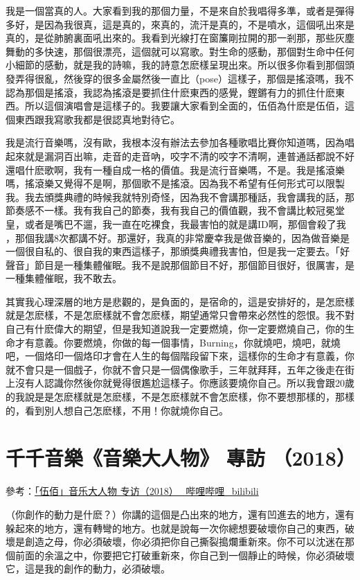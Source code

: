 \documentclass[UTF8,a4paper,oneside,twocolumn,12pt]{ctexbook}
\begin{document}
我是一個當真的人。大家看到我的那個力量，不是來自於我唱得多準，或者是彈得多好，是因為我很真，這是真的，來真的，流汗是真的，不是噴水，這個吼出來是真的，是從肺腑裏面吼出來的。我看到光線打在窗簾剛拉開的那一剎那，那些灰塵舞動的多快速，那個很漂亮，這個就可以寫歌。對生命的感動，那個對生命中任何小細節的感動，就是我的詩嘛，我的詩意怎麽樣呈現出來。所以很多你看到那個頭發弄得很亂，然後穿的很多金屬然後一直比（pose）這樣子，那個是搖滾嗎，我不認為那個是搖滾，我認為搖滾是要抓住什麽東西的感覺，鏗鏘有力的抓住什麽東西。所以這個演唱會是這樣子的。我要讓大家看到全面的，伍佰為什麽是伍佰，這個東西跟我寫歌我都是很認真地對待它。

我是流行音樂嗎，沒有歐，我根本沒有辦法去參加各種歌唱比賽你知道嗎，因為唱起來就是漏洞百出嘛，走音的走音吶，咬字不清的咬字不清啊，連普通話都說不好還唱什麽歌啊，我有一種自成一格的價值。我是流行音樂嗎，不是。我是搖滾樂嗎，搖滾樂又覺得不是啊，那個歌不是搖滾。因為我不希望有任何形式可以限製我。我去頒獎典禮的時候我就特別奇怪，因為我不會講那種話，我會講我的話，那節奏感不一樣。我有我自己的節奏，我有我自己的價值觀，我不會講比較冠冕堂皇，或者是嘴巴不遛，我一直在吃裸食，我最害怕的就是講ID啊，那個會殺了我 ，那個我講8次都講不好。那還好，我真的非常慶幸我是做音樂的，因為做音樂是一個很自私的、很自我的東西這樣子，那頒獎典禮我害怕，但是我一定要去。「好聲音」節目是一種集體催眠。我不是說那個節目不好，那個節目很好，很厲害，是一種集體催眠，我不敢去。

其實我心理深層的地方是悲觀的，是負面的，是宿命的，這是安排好的，是怎麽樣就是怎麽樣，不是怎麽樣就不會怎麽樣，期望通常只會帶來必然性的怨恨。我不對自己有什麽偉大的期望，但是我知道說我一定要燃燒，你一定要燃燒自己，你的生命才有意義。你要燃燒，你做的每一個事情，Burning，你就燒吧，燒吧，就燒吧，一個烙印一個烙印才會在人生的每個階段留下來，這樣你的生命才有意義，你就不會只是一個戲子，你就不會只是一個偶像歌手，三年就拜拜，五年之後走在街上沒有人認識你然後你就覺得很尷尬這樣子。你應該要燒你自己。所以我會跟20歲的我說是是怎麽樣就是怎麽樣，不是怎麽樣就不會怎麽樣，你不要想那樣的，那樣的，看到別人想自己怎麽樣，不用！你就燒你自己。

\section{千千音樂《音樂大人物》 專訪 （2018）}
參考：\href{https://www.bilibili.com/video/BV1o7411H7eK?vd_source=b28d2965994146c1572f764754540d4a}{「伍佰」音乐大人物 专访（2018）\_哔哩哔哩\_bilibili}

（你創作的動力是什麽？）你講的這個是凸出來的地方，還有凹進去的地方，還有躲起來的地方，還有轉彎的地方。也就是說每一次你總想要破壞你自己的東西，破壞是創造之母，你必須破壞，你必須把你自己撕裂搗爛重新來。你不可以沈迷在那個前面的余溫之中，你要把它打破重新來，你自己到一個靜止的時候，你必須破壞它，這是我的創作的動力，必須破壞。
\end{document}
